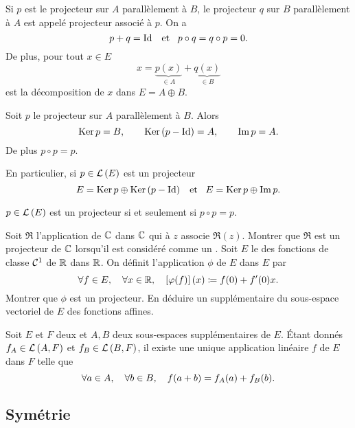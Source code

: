 \documentclass{magnoliaold}
\begin{document}
\begin{definition}[utile=1]
Si $p$ est le projecteur sur $A$ parallèlement à $B$, le projecteur $q$ sur
$B$ parallèlement à $A$ est appelé projecteur associé à $p$. On a
\[p+q=\operatorname{Id} \quad\!\text{et}\quad\! p\circ q=q\circ p=0.\]
De plus, pour tout $x\in E$
\[x=\underbrace{p(x)}_{\in A}+\underbrace{q(x)}_{\in B}\]  
est la décomposition de $x$ dans $E=A\oplus B$.
\end{definition}

\begin{proposition}[utile=1]
Soit $p$ le projecteur sur $A$ parallèlement à $B$. Alors
\[\mathop{\rm Ker} p=B, \qquad \mathop{\rm Ker}\left(p-\operatorname{Id}\right)=A, \qquad \operatorname{Im} p=A.\]
De plus $p\circ p=p$.
\end{proposition}

\begin{remarqueUnique}
\remarque[utile=1] En particulier, si $p\in\mathcal{L}\left(E\right)$ est un projecteur
  \[E=\mathop{\rm Ker} p\oplus\mathop{\rm Ker}\left(p-\operatorname{Id}\right) \quad\!\text{et}\quad\! E=\mathop{\rm Ker} p\oplus\operatorname{Im} p.\]
\end{remarqueUnique}

\begin{proposition}[utile=3]
$p\in\mathcal{L}\left(E\right)$ est un projecteur si et seulement si $p\circ p=p$.  
\end{proposition}

\begin{exos}
\exo Soit $\Re$ l'application de $\mathbb{C}$ dans $\mathbb{C}$ qui à $z$ associe
  $\Re(z)$. Montrer que $\Re$ est un projecteur de $\mathbb{C}$ lorsqu'il est considéré
  comme un \Rev.
\exo Soit $E$ le \Rev des fonctions de classe $\mathcal{C}^{1}$ de $\mathbb{R}$ dans
  $\mathbb{R}$. On définit l'application $\phi$ de $E$ dans $E$ par
  \[\forall f\in E ,\quad \forall x\in\mathbb{R} ,\quad \left[\varphi(f)\right](x)\coloneqq f(0)+f'(0)x.\]
  Montrer que $\phi$ est un projecteur. En déduire un supplémentaire du
  sous-espace vectoriel de $E$ des fonctions affines.
\end{exos}

\begin{proposition}[utile=1]
Soit $E$ et $F$ deux \Kevs et $A,B$ deux sous-espaces supplémentaires de $E$.
Étant donnés $f_A\in\mathcal{L}\left(A,F\right)$ et $f_B\in\mathcal{L}\left(B,F\right)$, il existe une unique
application linéaire $f$ de $E$ dans $F$ telle que
\[\forall a\in A ,\quad \forall b\in B ,\quad f(a+b)=f_A(a)+f_B(b).\]
\end{proposition}

\subsection{Symétrie}
\end{document}
